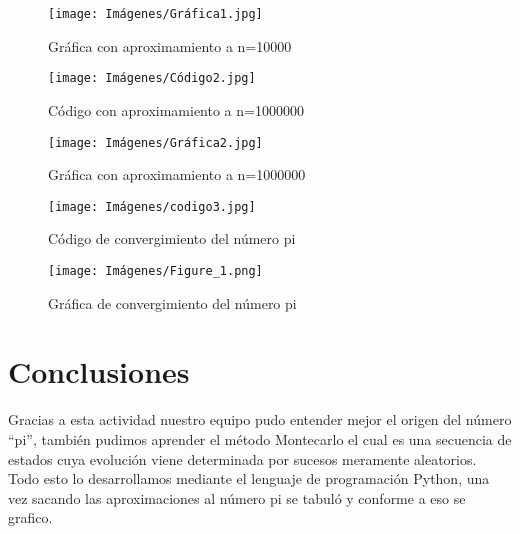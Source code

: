 \documentclass{article}
\begin{document}
\begin{figure} [htp]%
    \centering
    \texttt{[image: Imágenes/Gráfica1.jpg]} %
    \caption{Gráfica con aproximamiento a n=10000}
    \label{grafica 1}
\end{figure}


\begin{figure} [htp]%
    \centering
    \texttt{[image: Imágenes/Código2.jpg]} %
    \caption{Código con aproximamiento a n=1000000}
    \label{grafica}
\end{figure}

\begin{figure} [htp]%
    \centering
    \texttt{[image: Imágenes/Gráfica2.jpg]} %
    \caption{Gráfica con aproximamiento a n=1000000}
    \label{grafica}
\end{figure}
\nexpage

\begin{figure} [htp]%
    \centering
    \texttt{[image: Imágenes/codigo3.jpg]} %
    \caption{Código de convergimiento del número pi}
    \label{grafica}
\end{figure}

\begin{figure} [htp]%
    \centering
    \texttt{[image: Imágenes/Figure\_1.png]} %
    \caption{Gráfica de convergimiento del número pi}
    \label{grafica}
\end{figure}
\newpage

\section{Conclusiones}
Gracias a esta actividad nuestro equipo pudo entender mejor el origen del número “pi”, también pudimos aprender el método Montecarlo el cual es una secuencia de estados cuya evolución viene determinada por sucesos meramente aleatorios. Todo esto lo desarrollamos mediante el lenguaje de programación Python,  una vez sacando las aproximaciones al número pi se tabuló y conforme a eso se grafico.





\end{document}
